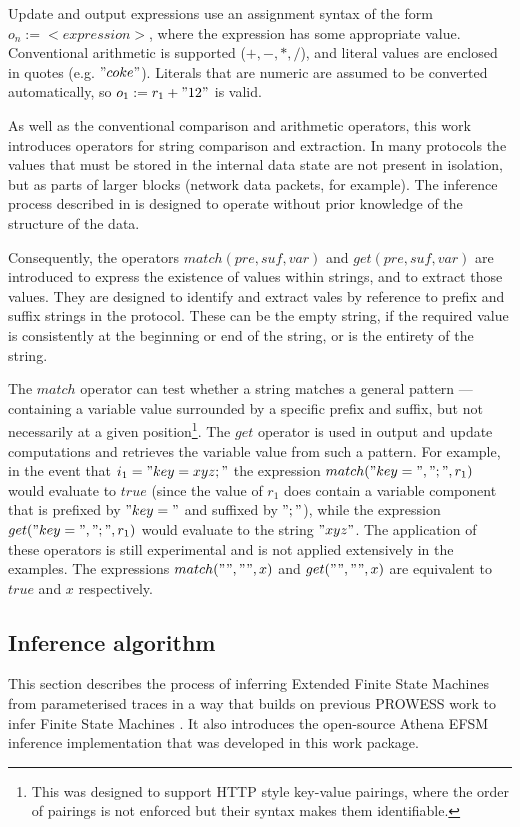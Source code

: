 Update and output expressions use an assignment syntax of the form $o_n := <expression>$, where the expression has some appropriate value. Conventional arithmetic is supported ($+,-,*,/$), and literal values are enclosed in quotes (e.g. $"coke"$). Literals that are numeric are assumed to be converted automatically, so $o_1 := r_1 + "12"$ is valid. 

As well as the conventional comparison and arithmetic operators, this work introduces operators for string comparison and extraction. In many protocols the values that must be stored in the internal data state are not present in isolation, but as parts of larger blocks (network data packets, for example). The inference process described in  is designed to operate without prior knowledge of the structure of the data. 

Consequently, the operators $match(pre,suf,var)$ and $get(pre,suf,var)$ are introduced to express the existence of values within strings, and to extract those values. They are designed to identify and extract vales by reference to prefix and suffix strings in the protocol. These can be the empty string, if the required value is consistently at the beginning or end of the string, or is the entirety of the string. 

The $match$ operator can test whether a string matches a general pattern --- containing a variable value surrounded by a specific prefix and suffix, but not necessarily at a given position\footnote{This was designed to support HTTP style key-value pairings, where the order of pairings is not enforced but their syntax makes them identifiable.}. The $get$ operator is used in output and update computations and retrieves the variable value from such a pattern. For example, in the event that $i_1 = "key=xyz;"$ the expression $match("key=",";",r_1)$ would evaluate to $true$ (since the value of $r_1$ does contain a variable component that is prefixed by $"key="$ and suffixed by $";"$), while the expression $get("key=",";",r_1)$ would evaluate to the string $"xyz"$. The application of these operators is still experimental and is not applied extensively in the examples. The expressions $match("","",x)$ and $get("","",x)$ are equivalent to $true$ and $x$ respectively.

\subsection{Inference algorithm}
\label{Algorithm}

This section describes the process of inferring Extended Finite State Machines from parameterised traces in a way that builds on previous PROWESS work to infer Finite State Machines \cite{}. It also introduces the open-source Athena \cite{Athena} EFSM inference implementation that was developed in this work package.


